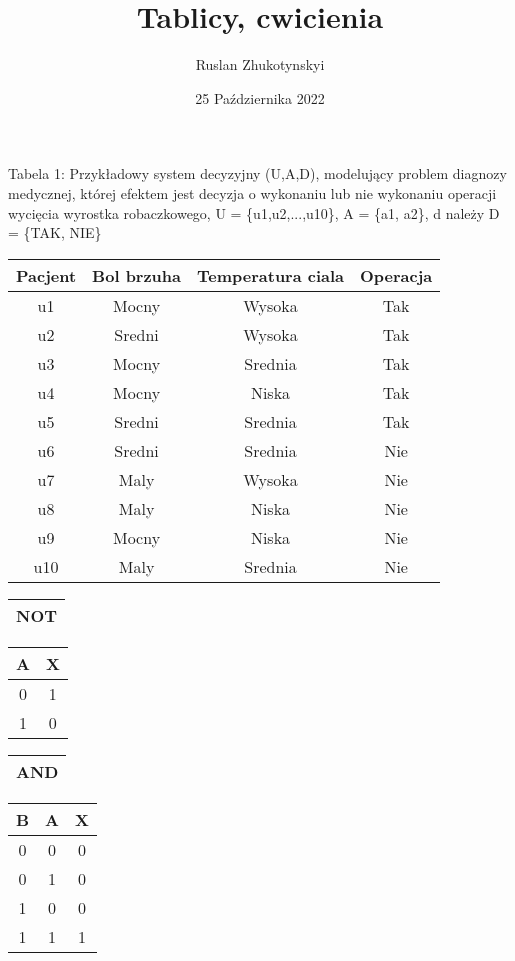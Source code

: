 \documentclass[12pt, letterpaper, titlepage]{article}
\title{Tablicy, cwicienia}
\author{Ruslan Zhukotynskyi}
\date{25 Października 2022}
\begin{document}
\maketitle
Tabela 1: Przykładowy system decyzyjny (U,A,D), modelujący problem diagnozy medycznej, której efektem jest decyzja o wykonaniu lub nie wykonaniu operacji wycięcia wyrostka robaczkowego, U = \{u1,u2,...,u10\}, A = \{a1, a2\}, d należy D = \{TAK, NIE\} 
\begin{center}
\begin{tabular}{ c| c c c }
\hline
Pacjent & Bol brzuha & Temperatura ciala & Operacja \\
\hline
u1 & Mocny & Wysoka & Tak \\
u2 & Sredni & Wysoka & Tak \\
u3 & Mocny & Srednia & Tak \\
u4 & Mocny & Niska & Tak \\
u5 & Sredni & Srednia & Tak \\
u6 & Sredni & Srednia & Nie \\
u7 & Maly & Wysoka & Nie \\
u8 & Maly & Niska & Nie \\
u9 & Mocny & Niska & Nie \\
u10 & Maly & Srednia & Nie \\
\hline
\end{tabular}
\end{center}
\newpage
\begin{center}
\begin{tabular}{ |c| }
\hline
NOT \\
\hline
\end{tabular}
\end{center}
\begin{center}
\begin{tabular}{ |c|c| }
\hline
A & X \\
\hline
0 & 1 \\
\hline
1 & 0 \\
\hline
\end{tabular}
\end{center}
\begin{center}
\begin{tabular}{ |c| }
\hline
AND \\
\hline
\end{tabular}
\end{center}
\begin{center}
\begin{tabular}{ |c|c|c| }
\hline
B & A & X \\
\hline
0 & 0 & 0 \\
0 & 1 & 0 \\
1 & 0 & 0 \\
1 & 1 & 1 \\
\hline
\end{tabular}
\end{center}
\end{document}
